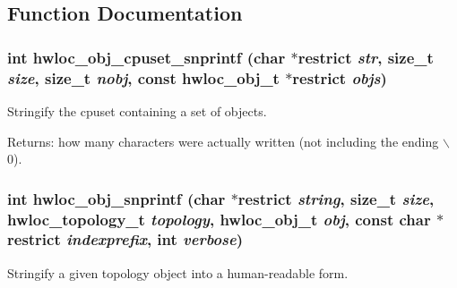 \subsection{Function Documentation}
\hypertarget{group__hwlocality__conversion_ge001fafdeda3a67695d406affde1ab0d}{
\subsubsection[{hwloc\_\-obj\_\-cpuset\_\-snprintf}]{\setlength{\rightskip}{0pt plus 5cm}int hwloc\_\-obj\_\-cpuset\_\-snprintf (char $\ast$restrict {\em str}, \/  size\_\-t {\em size}, \/  size\_\-t {\em nobj}, \/  const {\bf hwloc\_\-obj\_\-t} $\ast$restrict {\em objs})}}
\label{group__hwlocality__conversion_ge001fafdeda3a67695d406affde1ab0d}


Stringify the cpuset containing a set of objects. 

\begin{Desc}
\item[Returns:]how many characters were actually written (not including the ending $\backslash$0). \end{Desc}
\hypertarget{group__hwlocality__conversion_g612dc210053b65d2466ac7ad39db92a4}{
\subsubsection[{hwloc\_\-obj\_\-snprintf}]{\setlength{\rightskip}{0pt plus 5cm}int hwloc\_\-obj\_\-snprintf (char $\ast$restrict {\em string}, \/  size\_\-t {\em size}, \/  {\bf hwloc\_\-topology\_\-t} {\em topology}, \/  {\bf hwloc\_\-obj\_\-t} {\em obj}, \/  const char $\ast$restrict {\em indexprefix}, \/  int {\em verbose})}}
\label{group__hwlocality__conversion_g612dc210053b65d2466ac7ad39db92a4}


Stringify a given topology object into a human-readable form. 

